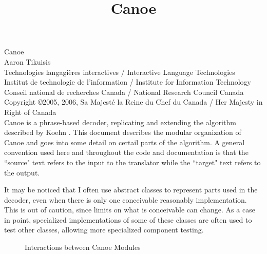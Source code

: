 \documentclass[12pt]{amsart} \usepackage{epsfig} \usepackage{rotating}
\begin{document}
\title{Canoe} \maketitle

{\tiny
\noindent
   Canoe\\ 
   Aaron Tikuisis\\ 
   Technologies langagi{\`e}res interactives /
      Interactive Language Technologies\\
   Institut de technologie de l'information /
      Institute for Information Technology\\
   Conseil national de recherches Canada / National Research Council Canada\\ 
   Copyright \copyright 2005, 2006, Sa Majest{\'e} la Reine du Chef du Canada /
      Her Majesty in Right of Canada }
\\



Canoe is a phrase-based decoder, replicating and extending the
algorithm described by Koehn \cite{koehn03}.  This document
describes the modular organization of Canoe and goes into some detail on
certail parts of the algorithm.  A general convention used here and throughout
the code and documentation is that the ``source" text refers to the input to
the translator while the ``target" text refers to the output.

It may be noticed that I often use abstract classes to represent parts used in
the decoder, even when there is only one conceivable reasonably implementation.
This is out of caution, since limits on what is conceivable can change.  As a
case in point, specialized implementations of some of these classes are often
used to test other classes, allowing more specialized component testing.

\begin{sidewaysfigure}
\centerline{}
\caption{Interactions between Canoe Modules\label{fig:uml}}
\end{sidewaysfigure}
\end{document}
